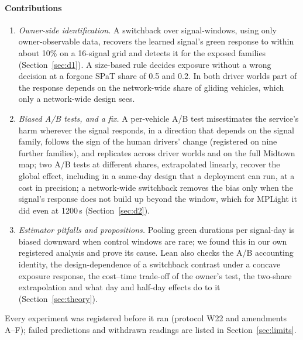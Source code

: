 \paragraph{Contributions}
\begin{enumerate}\setlength\itemsep{1pt}
\item \emph{Owner-side identification.} A switchback over signal-windows, using only owner-observable data, recovers the learned
signal's green response to within about 10\% on a 16-signal grid and detects it for the exposed families (Section~\ref{sec:d1}). A
size-based rule decides exposure without a wrong decision at a forgone SPaT share of 0.5 and 0.2. In both driver worlds part of the
response depends on the network-wide share of gliding vehicles, which only a network-wide design sees.
\item \emph{Biased A/B tests, and a fix.} A per-vehicle A/B test misestimates the service's harm wherever the signal responds, in a
direction that depends on the signal family, follows the sign of the human drivers' change (registered on nine further families), and
replicates across driver worlds and on the full Midtown map; two A/B tests at different shares, extrapolated linearly, recover the
global effect, including in a same-day design that a deployment can run, at a cost in precision; a network-wide switchback removes the
bias only when the signal's response does not build up beyond the window, which for MPLight it did even at 1200\,s (Section~\ref{sec:d2}).
\item \emph{Estimator pitfalls and propositions.} Pooling green durations per signal-day is biased downward when control windows
are rare; we found this in our own registered analysis and prove its cause. Lean also checks the A/B accounting identity, the
design-dependence of a switchback contrast under a concave exposure response, the cost--time trade-off of the owner's test, the
two-share extrapolation and what day and half-day effects do to it (Section~\ref{sec:theory}).
\end{enumerate}
Every experiment was registered before it ran (protocol W22 and amendments A--F); failed predictions and withdrawn readings are listed
in Section~\ref{sec:limits}.


